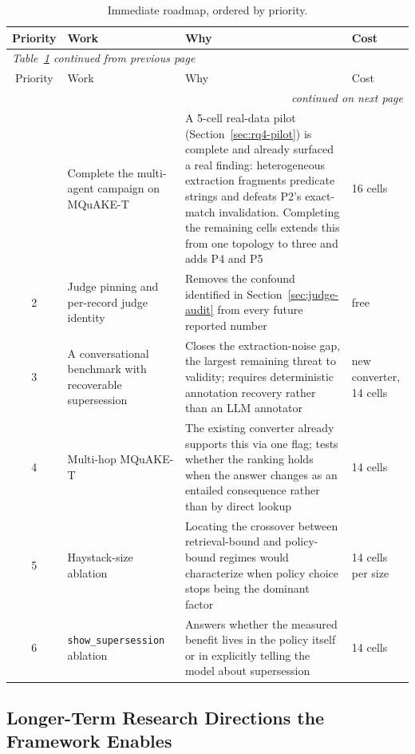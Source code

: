 \small
\begin{center}
\begin{longtable}{cp{3.4cm}p{6cm}p{2cm}}
\caption{Immediate roadmap, ordered by priority.}\label{tab:roadmap}\\
\toprule
Priority & Work & Why & Cost \\
\midrule
\endfirsthead
\multicolumn{4}{l}{\small\itshape Table~\ref{tab:roadmap} continued from previous page} \\
\toprule
Priority & Work & Why & Cost \\
\midrule
\endhead
\midrule
\multicolumn{4}{r}{\small\itshape continued on next page} \\
\endfoot
\bottomrule
\endlastfoot
1 & Complete the multi-agent campaign on MQuAKE-T & A 5-cell real-data pilot (Section~\ref{sec:rq4-pilot}) is complete and already surfaced a real finding: heterogeneous extraction fragments predicate strings and defeats P2's exact-match invalidation. Completing the remaining cells extends this from one topology to three and adds P4 and P5 & 16 cells \\
2 & Judge pinning and per-record judge identity & Removes the confound identified in Section~\ref{sec:judge-audit} from every future reported number & free \\
3 & A conversational benchmark with recoverable supersession & Closes the extraction-noise gap, the largest remaining threat to validity; requires deterministic annotation recovery rather than an LLM annotator & new converter, 14 cells \\
4 & Multi-hop MQuAKE-T & The existing converter already supports this via one flag; tests whether the ranking holds when the answer changes as an entailed consequence rather than by direct lookup & 14 cells \\
5 & Haystack-size ablation & Locating the crossover between retrieval-bound and policy-bound regimes would characterize when policy choice stops being the dominant factor & 14 cells per size \\
6 & \texttt{show\_supersession} ablation & Answers whether the measured benefit lives in the policy itself or in explicitly telling the model about supersession & 14 cells \\
\end{longtable}
\end{center}
\normalsize

\subsection{Longer-Term Research Directions the Framework Enables}
\label{sec:longer-term}

